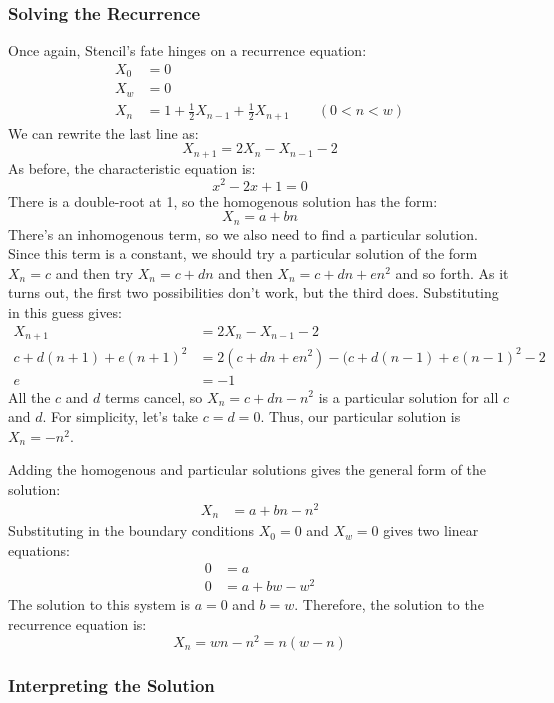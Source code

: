 \subsubsection*{Solving the Recurrence}

Once again, Stencil's fate hinges on a recurrence equation:
%
\[
\begin{array}{rl}
X_0 & = 0 \\
X_w & = 0 \\
X_n & = 1 + \frac{1}{2} X_{n-1} + \frac{1}{2} X_{n+1} \qquad (0 < n < w)
\end{array}
\]
%
We can rewrite the last line as:
%
\[
X_{n+1} = 2 X_n - X_{n-1} - 2
\]
%
As before, the characteristic equation is:
%
\[
x^2 - 2 x + 1 = 0
\]
%
There is a double-root at 1, so the homogenous solution has the form:
%
\[
X_n = a + b n
\]
%
There's an inhomogenous term, so we also need to find a particular
solution.  Since this term is a constant, we should try a particular
solution of the form $X_n = c$ and then try $X_n = c + d n$ and then
$X_n = c + d n + e n^2$ and so forth.  As it turns out, the first two
possibilities don't work, but the third does.  Substituting in this
guess gives:
%
\begin{align*}
X_{n+1} & = 2 X_n - X_{n-1} - 2 \\
c + d(n+1) + e(n+1)^2 & = 2 (c + dn + en^2) - (c + d(n-1) + e(n-1)^2 - 2 \\
e & = -1
\end{align*}
%
All the $c$ and $d$ terms cancel, so $X_n = c + d n - n^2$ is a
particular solution for all $c$ and $d$.  For simplicity, let's take
$c = d = 0$.  Thus, our particular solution is $X_n = - n^2$.

Adding the homogenous and particular solutions gives the general form
of the solution:
%
\begin{align*}
X_n & = a + b n - n^2
\end{align*}
%
Substituting in the boundary conditions $X_0 = 0$ and $X_w = 0$ gives
two linear equations:
%
\begin{align*}
0 & = a \\
0 & = a + b w - w^2
\end{align*}
%
The solution to this system is $a = 0$ and $b = w$.  Therefore, the
solution to the recurrence equation is:
%
\[
X_n = w n - n^2 = n (w - n)
\]

\subsubsection*{Interpreting the Solution}

